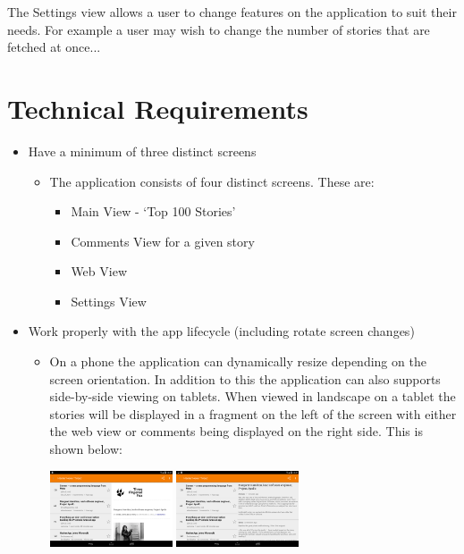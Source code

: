 \documentclass[11pt]{article}
\begin{document}
The Settings view allows a user to change features on the application to suit their needs. For example a user may wish to change the number of stories that are fetched at once...

\section*{Technical Requirements}

\begin{itemize}
	\item{Have a minimum of three distinct screens}
	\begin{itemize}
		\item{The application consists of four distinct screens. These are:}
		\begin{itemize}
			\item{Main View - ‘Top 100 Stories'}
			\item{Comments View for a given story}
			\item{Web View}
			\item{Settings View}
		\end{itemize}
		\end{itemize}
		\item{Work properly with the app lifecycle (including rotate screen changes)}
		\begin{itemize}
			\item{On a phone the application can dynamically resize depending on the screen orientation. In addition to this the application can also supports side-by-side viewing on tablets. When viewed in landscape on a tablet the stories will be displayed in a fragment on the left of the screen with either the web view or comments being displayed on the right side. This is shown below:}
			\\
			\begin{center}
				\includegraphics[width=0.3\textwidth]{tabletWeb.png}
				\includegraphics[width=0.3\textwidth]{tabletComments.png}

\end{center}
\end{itemize}
\end{itemize}
\end{document}
